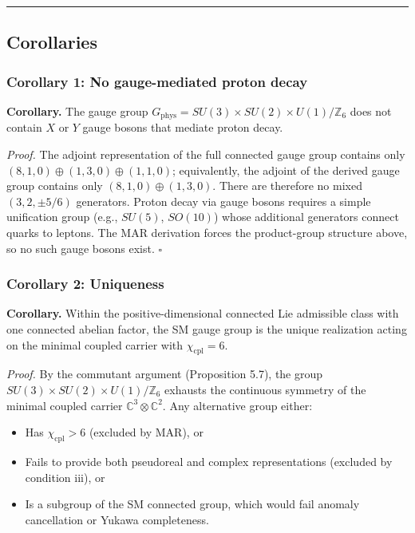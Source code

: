 \begin{center}\rule{0.5\linewidth}{0.5pt}\end{center}

\subsection{Corollaries}\label{8-corollaries}

\subsubsection{Corollary 1: No gauge-mediated proton decay}\label{corollary-1-no-gauge-mediated-proton-decay}

\textbf{Corollary.} The gauge group \(G_{\mathrm{phys}} = SU(3) \times SU(2) \times U(1)/\mathbb{Z}_6\) does not contain \(X\) or \(Y\) gauge bosons that mediate proton decay.

\emph{Proof.} The adjoint representation of the full connected gauge group contains only \((8,1,0)\oplus(1,3,0)\oplus(1,1,0)\); equivalently, the adjoint of the derived gauge group contains only \((8,1,0)\oplus(1,3,0)\). There are therefore no mixed \((3,2,\pm 5/6)\) generators. Proton decay via gauge bosons requires a simple unification group (e.g., \(SU(5)\), \(SO(10)\)) whose additional generators connect quarks to leptons. The MAR derivation forces the product-group structure above, so no such gauge bosons exist. \(\square\)

\subsubsection{Corollary 2: Uniqueness}\label{corollary-2-uniqueness}

\textbf{Corollary.} Within the positive-dimensional connected Lie admissible class with one connected abelian factor, the SM gauge group is the unique realization acting on the minimal coupled carrier with \(\chi_{\mathrm{cpl}} = 6\).

\emph{Proof.} By the commutant argument (Proposition 5.7), the group \(SU(3) \times SU(2) \times U(1)/\mathbb{Z}_6\) exhausts the continuous symmetry of the minimal coupled carrier \(\mathbb{C}^3 \otimes \mathbb{C}^2\). Any alternative group either:

\begin{itemize}
\tightlist
\item
  Has \(\chi_{\mathrm{cpl}} > 6\) (excluded by MAR), or
\item
  Fails to provide both pseudoreal and complex representations (excluded by condition iii), or
\item
  Is a subgroup of the SM connected group, which would fail anomaly cancellation or Yukawa completeness.
\end{itemize}

